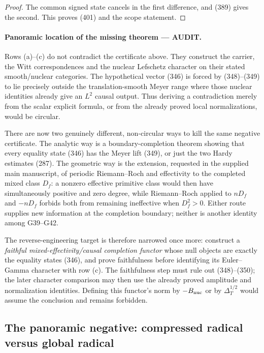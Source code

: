 \documentclass[11pt]{article}
\newcommand{\AUDIT}{\textcolor{orange!75!black}{\textbf{AUDIT}}}
\begin{document}
\begin{proof}
The common signed state cancels in the first difference, and (389) gives the
second.  This proves (401) and the scope statement.
\end{proof}

\paragraph{Panoramic location of the missing theorem --- \AUDIT.}
Rows (a)--(c) do not contradict the certificate above.  They construct the
carrier, the Witt correspondences and the nuclear Lefschetz character on
their stated smooth/nuclear categories.  The hypothetical vector (346) is
forced by (348)--(349) to lie precisely outside the translation-smooth Meyer
range where those nuclear identities already give an $L^2$ causal output.
Thus deriving a contradiction merely from the scalar explicit formula, or
from the already proved local normalizations, would be circular.

There are now two genuinely different, non-circular ways to kill the same
negative certificate.  The analytic way is a boundary-completion theorem
showing that every equality state (346) has the Meyer lift (349), or just the
two Hardy estimates (287).  The geometric way is the extension, requested in
the supplied main manuscript, of periodic Riemann--Roch and effectivity to
the completed mixed class $D_f$: a nonzero effective primitive class would
then have simultaneously positive and zero degree, while Riemann--Roch
applied to $nD_f$ and $-nD_f$ forbids both from remaining ineffective when
$D_f^2>0$.  Either route supplies new information at the completion boundary;
neither is another identity among G39--G42.

The reverse-engineering target is therefore narrowed once more: construct a
\emph{faithful mixed-effectivity/causal completion functor} whose null
objects are exactly the equality states (346), and prove faithfulness before
identifying its Euler--Gamma character with row (c).  The faithfulness step
must rule out (348)--(350); the later character comparison may then use the
already proved amplitude and normalization identities.  Defining this
functor's norm by $-B_{\rm nuc}$ or by $\Delta_T^{1/2}$ would assume the
conclusion and remains forbidden.

\subsection{The panoramic negative: compressed radical versus global radical}
\end{document}
